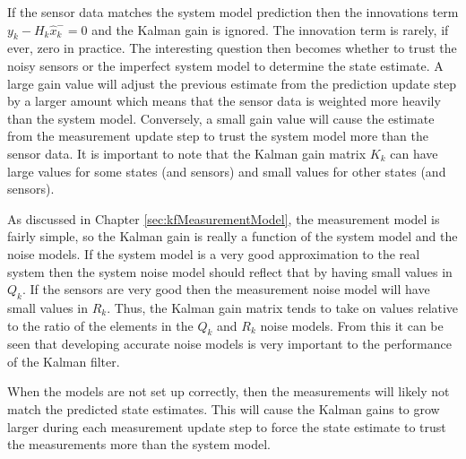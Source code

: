 If the sensor data matches the system model prediction then the innovations term $y_k-H_k\hat{x}_k^-=0$ and the Kalman gain is ignored. The innovation term is rarely, if ever, zero in practice. The interesting question then becomes whether to trust the noisy sensors or the imperfect system model to determine the state estimate. A large gain value will adjust the previous estimate from the prediction update step by a larger amount which means that the sensor data is weighted more heavily than the system model. Conversely, a small gain value will cause the estimate from the measurement update step to trust the system model more than the sensor data. It is important to note that the Kalman gain matrix $K_k$ can have large values for some states (and sensors) and small values for other states (and sensors).

As discussed in Chapter \ref{sec:kfMeasurementModel}, the measurement model is fairly simple, so the Kalman gain is really a function of the system model and the noise models. If the system model is a very good approximation to the real system then the system noise model should reflect that by having small values in $Q_k$. If the sensors are very good then the measurement noise model will have small values in $R_k$. Thus, the Kalman gain matrix tends to take on values relative to the ratio of the elements in the $Q_k$ and $R_k$ noise models. From this it can be seen that developing accurate noise models is very important to the performance of the Kalman filter.

When the models are not set up correctly, then the measurements will likely not match the predicted state estimates. This will cause the Kalman gains to grow larger during each measurement update step to force the state estimate to trust the measurements more than the system model.

